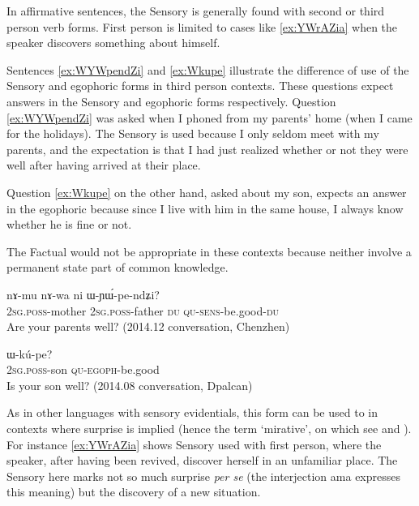 \documentclass[oldfontcommands,oneside,a4paper,11pt]{article}
\newcommand{\ipa}[1]{{\phon \mbox{#1}}} %
\begin{document}
In affirmative sentences, the Sensory is generally found with second or third person verb forms. First person is limited to  cases like \ref{ex:YWrAZia} when the speaker discovers something about himself.

Sentences \ref{ex:WYWpendZi} and \ref{ex:Wkupe} illustrate the difference of use of the Sensory and egophoric forms in third person contexts. These questions expect answers in the Sensory and egophoric forms respectively. Question \ref{ex:WYWpendZi} was asked when I phoned from my parents' home (when I came for the holidays). The Sensory is used because I only seldom meet with my parents, and the expectation is that I had just realized whether or not they were well after having arrived at their place. 

Question \ref{ex:Wkupe} on the other hand, asked about my son, expects an answer in the egophoric because since I live with him in the same house, I always know whether he is fine or not.

The Factual would not be appropriate in these contexts because neither involve a permanent state part of common knowledge.

\begin{exe}
\ex \label{ex:WYWpendZi}
\gll 
\ipa{nɤ-mu}  	\ipa{nɤ-wa}  	\ipa{ni}  	\ipa{ɯ-ɲɯ́-pe-ndʑi?}  \\
\textsc{2sg.poss}-mother \textsc{2sg.poss}-father \textsc{du} \textsc{qu-sens}-be.good-\textsc{du} \\
\glt Are your parents well? (2014.12 conversation, Chenzhen)
\end{exe}


\begin{exe}
\ex \label{ex:Wkupe}
\gll \ipa{nɤ-tɕɯ} \ipa{ɯ-kú-pe?}\\
\textsc{2sg.poss}-son \textsc{qu-egoph}-be.good\\
\glt Is your son well? (2014.08 conversation, Dpalcan)
\end{exe}

 
 As in other languages with sensory evidentials, this form can be used to in contexts where surprise is implied (hence the term `mirative', on which see \citealt{delancey97mirative} and \citealt{hill12mirativity}). For instance \ref{ex:YWrAZia} shows Sensory used with first person, where the speaker, after having been revived, discover herself in an unfamiliar place. The Sensory here marks not so much surprise \textit{per se} (the interjection \ipa{ama} expresses this meaning) but the discovery of a new situation.
\end{document}
